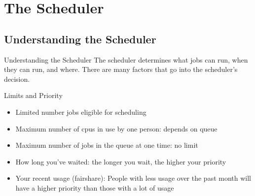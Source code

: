 \documentclass[handout]{beamer}
\begin{document}
\section{The Scheduler}
\subsection{Understanding the Scheduler}
\begin{frame}{Understanding the Scheduler}
The scheduler determines what jobs can run, when they can run, and where.  There
are many factors that go into the scheduler's decision.
   \begin{block}{Limits and Priority}
    \begin{itemize}
    \item<1-> Limited number jobs eligible for scheduling
    \item<1-> Maximum number of cpus in use by one person: depends on queue
    \item<1-> Maximum number of jobs in the queue at one time: no limit
    \end{itemize}
    \begin{itemize}
    \item<2-> How long you've waited: the longer you wait, the higher your priority
    \item<2-> Your recent usage (fairshare): People with less usage over the past month will have a higher priority than those with a lot of usage

    \end{itemize}
   \end{block}
\end{frame}
\end{document}
